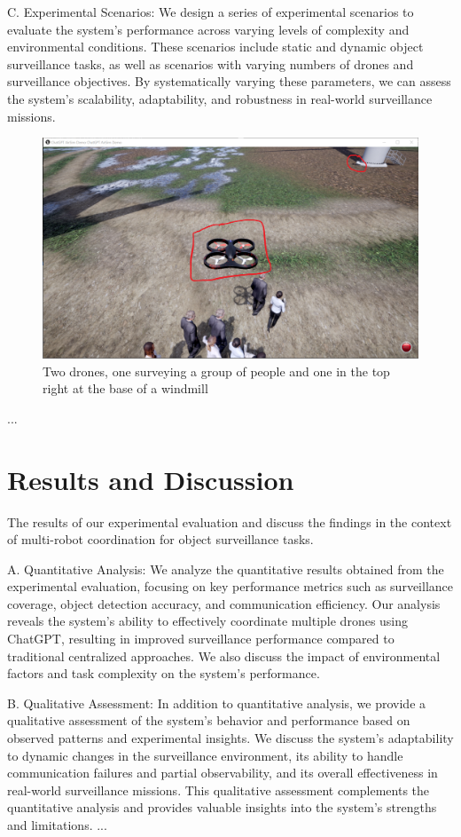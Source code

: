 \documentclass[journal]{IEEEtran}
\begin{document}
C. Experimental Scenarios: We design a series of experimental scenarios to evaluate the system's performance across varying levels of complexity and environmental conditions. These scenarios include static and dynamic object surveillance tasks, as well as scenarios with varying numbers of drones and surveillance objectives. By systematically varying these parameters, we can assess the system's scalability, adaptability, and robustness in real-world surveillance missions.
\begin{figure}[h]
    \centering
    \includegraphics[width=1\linewidth]{2drones_ppl_wmd.PNG}
    \caption{Two drones, one surveying a group of people and one in the top right at the base of a windmill}
    \label{fig:enter-label}
\end{figure}
...

\section{Results and Discussion}

The results of our experimental evaluation and discuss the findings in the context of multi-robot coordination for object surveillance tasks.

A. Quantitative Analysis: We analyze the quantitative results obtained from the experimental evaluation, focusing on key performance metrics such as surveillance coverage, object detection accuracy, and communication efficiency. Our analysis reveals the system's ability to effectively coordinate multiple drones using ChatGPT, resulting in improved surveillance performance compared to traditional centralized approaches. We also discuss the impact of environmental factors and task complexity on the system's performance.

B. Qualitative Assessment: In addition to quantitative analysis, we provide a qualitative assessment of the system's behavior and performance based on observed patterns and experimental insights. We discuss the system's adaptability to dynamic changes in the surveillance environment, its ability to handle communication failures and partial observability, and its overall effectiveness in real-world surveillance missions. This qualitative assessment complements the quantitative analysis and provides valuable insights into the system's strengths and limitations.
...
\end{document}
